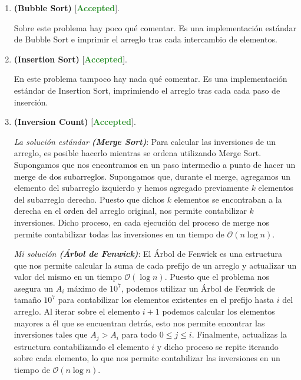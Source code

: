\documentclass{article}
\begin{document}
    \begin{enumerate}[label=\textbf{Problema \arabic*}]
        \item \textbf{(Bubble Sort)} [\textcolor{ForestGreen}{\textbf{Accepted}}].
    
        Sobre este problema hay poco qué comentar. Es una implementación estándar de Bubble Sort e imprimir el arreglo tras cada intercambio de elementos.

        \item \textbf{(Insertion Sort)} [\textcolor{ForestGreen}{\textbf{Accepted}}].
        
        En este problema tampoco hay nada qué comentar. Es una implementación estándar de Insertion Sort, imprimiendo el arreglo tras cada cada paso de inserción. 

        \item \textbf{(Inversion Count)} [\textcolor{ForestGreen}{\textbf{Accepted}}].
        
        \textit{La solución estándar \textbf{(Merge Sort)}}: Para calcular las inversiones de un arreglo, es posible hacerlo mientras se ordena utilizando Merge Sort. Supongamos que nos encontramos en un paso intermedio a punto de hacer un merge de dos subarreglos. Supongamos que, durante el merge, agregamos un elemento del subarreglo izquierdo y hemos agregado previamente $k$ elementos del subarreglo derecho. Puesto que dichos $k$ elementos se encontraban a la derecha en el orden del arreglo original, nos permite contabilizar $k$ inversiones. Dicho proceso, en cada ejecución del proceso de merge nos permite contabilizar todas las inversiones en un tiempo de $\mathcal{O}(n \log n)$.

        \textit{Mi solución \textbf{(Árbol de Fenwick)}}: El Árbol de Fenwick es una estructura que nos permite calcular la suma de cada prefijo de un arreglo y actualizar un valor del mismo en un tiempo $\mathcal{O}(\log n)$. Puesto que el problema nos asegura un $A_i$ máximo de $10^7$, podemos utilizar un Árbol de Fenwick de tamaño $10^7$ para contabilizar los elementos existentes en el prefijo hasta $i$ del arreglo. Al iterar sobre el elemento $i + 1$ podemos calcular los elementos mayores a él que se encuentran detrás, esto nos permite encontrar las inversiones tales que $A_j > A_i$ para todo $0 \leq j \leq i$. Finalmente, actualizas la estructura contabilizando el elemento $i$ y dicho proceso se repite iterando sobre cada elemento, lo que nos permite contabilizar las inversiones en un tiempo de $\mathcal{O}(n \log n)$.
    \end{enumerate}
\end{document}
